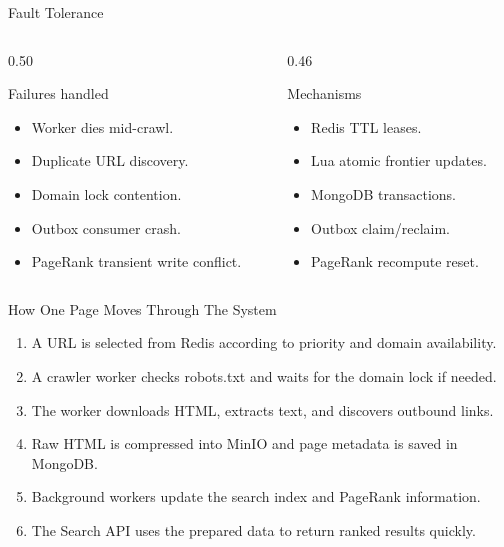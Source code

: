 \documentclass[aspectratio=169,11pt]{beamer}
\begin{document}
\begin{frame}{Fault Tolerance}
  \begin{columns}[T,totalwidth=\textwidth]
    \begin{column}{0.50\textwidth}
      \begin{block}{Failures handled}
        \begin{itemize}
          \item Worker dies mid-crawl.
          \item Duplicate URL discovery.
          \item Domain lock contention.
          \item Outbox consumer crash.
          \item PageRank transient write conflict.
        \end{itemize}
      \end{block}
    \end{column}
    \begin{column}{0.46\textwidth}
      \begin{block}{Mechanisms}
        \begin{itemize}
          \item Redis TTL leases.
          \item Lua atomic frontier updates.
          \item MongoDB transactions.
          \item Outbox claim/reclaim.
          \item PageRank recompute reset.
        \end{itemize}
      \end{block}
    \end{column}
  \end{columns}
\end{frame}

\begin{frame}{How One Page Moves Through The System}
  \begin{enumerate}
    \item A URL is selected from Redis according to priority and domain availability.
    \item A crawler worker checks robots.txt and waits for the domain lock if needed.
    \item The worker downloads HTML, extracts text, and discovers outbound links.
    \item Raw HTML is compressed into MinIO and page metadata is saved in MongoDB.
    \item Background workers update the search index and PageRank information.
    \item The Search API uses the prepared data to return ranked results quickly.
  \end{enumerate}
\end{frame}
\end{document}
